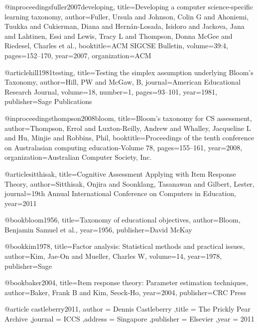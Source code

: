 @inproceedings{fuller2007developing,
  title={Developing a computer science-specific learning taxonomy},
  author={Fuller, Ursula and Johnson, Colin G and Ahoniemi, Tuukka and Cukierman, Diana and Hern{\'a}n-Losada, Isidoro and Jackova, Jana and Lahtinen, Essi and Lewis, Tracy L and Thompson, Donna McGee and Riedesel, Charles et al.},
  booktitle={ACM SIGCSE Bulletin},
  volume={39:4},
  pages={152--170},
  year={2007},
  organization={ACM}
}


@article{hill1981testing,
  title={Testing the simplex assumption underlying Bloom's Taxonomy},
  author={Hill, PW and McGaw, B},
  journal={American Educational Research Journal},
  volume={18},
  number={1},
  pages={93--101},
  year={1981},
  publisher={Sage Publications}
}

@inproceedings{thompson2008bloom,
  title={Bloom's taxonomy for CS assessment},
  author={Thompson, Errol and Luxton-Reilly, Andrew and Whalley, Jacqueline L and Hu, Minjie and Robbins, Phil},
  booktitle={Proceedings of the tenth conference on Australasian computing education-Volume 78},
  pages={155--161},
  year={2008},
  organization={Australian Computer Society, Inc.}
}


@article{sitthisak,
  title={Cognitive Assessment Applying with Item Response Theory},
  author={Sitthisak, Onjira and Soonklang, Tasanawan and Gilbert, Lester},
  journal={19th Annual International Conference on Computers in Education},
  year={2011}
}

@book{bloom1956,
  title={Taxonomy of educational objectives},
  author={Bloom, Benjamin Samuel et al.},
  year={1956},
  publisher={David McKay}
}

@book{kim1978,
  title={Factor analysis: Statistical methods and practical issues},
  author={Kim, Jae-On and Mueller, Charles W},
  volume={14},
  year={1978},
  publisher={Sage}
}

@book{baker2004,
  title={Item response theory: Parameter estimation techniques},
  author={Baker, Frank B and Kim, Seock-Ho},
  year={2004},
  publisher={CRC Press}
}

@article{ castleberry2011,
          author    = {Dennis Castleberry}
         ,title     = {The Prickly Pear Archive}
         ,journal   = {ICCS}
         ,address   = {Singapore}
         ,publisher = {Elsevier}
         ,year      = {2011}
}

